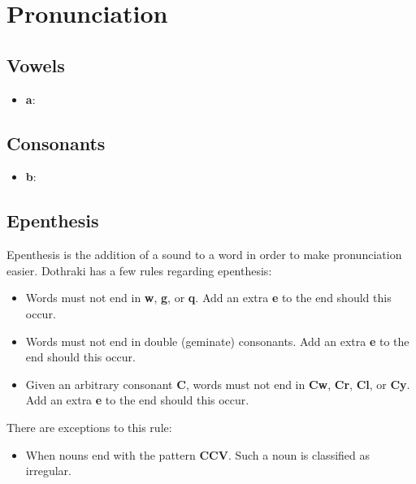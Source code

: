 \chapter*{Pronunciation}
\section*{Vowels}
\begin{itemize}
	\item \textbf{a}:
\end{itemize}
\section*{Consonants}
\begin{itemize}
	\item \textbf{b}:
\end{itemize}
\section*{Epenthesis}
Epenthesis is the addition of a sound to a word in order to make pronunciation
easier. Dothraki has a few rules regarding epenthesis:
\begin{itemize}
	\item Words must not end in \textbf{w}, \textbf{g}, or \textbf{q}. Add an extra \textbf{e} to the
				end should this occur.
	\item Words must not end in double (geminate) consonants.
        Add an extra \textbf{e} to the end should this occur.
	\item Given an arbitrary consonant \textbf{C}, words must not end in
				\textbf{Cw}, \textbf{Cr}, \textbf{Cl}, or \textbf{Cy}.
				Add an extra \textbf{e} to the end should this occur.
\end{itemize}
There are exceptions to this rule:
\begin{itemize}
	\item When nouns end with the pattern \textbf{CCV}. Such a noun is classified as
				irregular.
\end{itemize}
